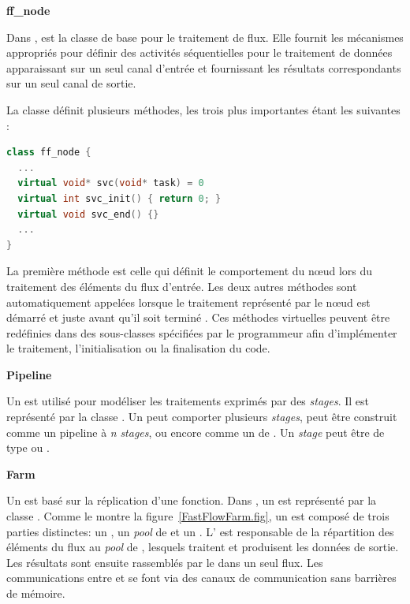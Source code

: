 \textbf{ff\_node}

Dans ,  est la classe de base pour le traitement de flux. Elle fournit les m\'ecanismes appropri\'es pour d\'efinir des activit\'es s\'equentielles pour le traitement de données apparaissant sur un seul canal d'entr\'ee et fournissant les r\'esultats correspondants sur un seul canal de sortie. 

La classe  d\'efinit plusieurs m\'ethodes, les trois plus importantes \'etant les suivantes :
\begin{lstlisting}[language=c++]
class ff_node {
  ...
  virtual void* svc(void* task) = 0
  virtual int svc_init() { return 0; } 
  virtual void svc_end() {} 
  ...
}
\end{lstlisting}

La premi\`ere m\'ethode est celle qui d\'efinit le comportement du nœud lors du traitement des \'el\'ements du flux d'entr\'ee. Les deux autres m\'ethodes sont automatiquement appel\'ees lorsque le traitement repr\'esent\'e par le nœud est d\'emarr\'e  et juste avant qu'il soit termin\'e . Ces m\'ethodes virtuelles peuvent \^etre red\'efinies dans des sous-classes  sp\'ecifi\'ees par le programmeur afin d'impl\'ementer le traitement, l'initialisation ou la finalisation du code.


\textbf{Pipeline}

Un  est utilis\'e pour mod\'eliser les traitements exprim\'es par des \emph{stages}. Il est repr\'esent\'e par la classe . Un  peut comporter plusieurs \emph{stages}, peut \^etre construit comme un pipeline \`a \emph{n} \emph{stages}, ou encore comme un  de . Un \emph{stage} peut \^etre de type  ou .


\textbf{Farm}

Un  est bas\'e sur la r\'eplication d'une fonction. Dans , un  est repr\'esent\'e par la classe . Comme le montre la figure~\ref{FastFlowFarm.fig}, un  est compos\'e de trois parties distinctes: un , un  \emph{pool} de  et un . L' est responsable de la r\'epartition des \'el\'ements du flux au \emph{pool} de , lesquels traitent et produisent les donn\'ees de sortie. Les r\'esultats sont ensuite rassembl\'es par le  dans un seul flux. Les communications entre  et  se font via des canaux de communication sans barri\`eres de m\'emoire.

